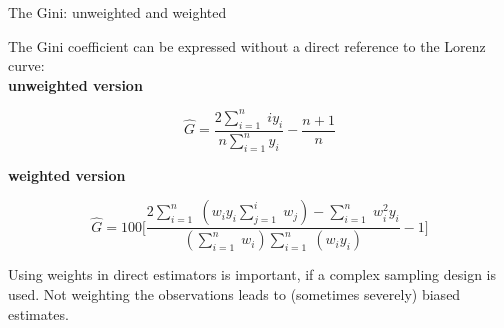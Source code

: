 \documentclass[fleqn,final]{beamer}
\newcommand{\Pheight}{\rule[-5mm]{0cm}{1cm}}
\begin{document}
\begin{frame}
\begin{columns}[t]
\begin{column}{.3\linewidth}
 \begin{block}{The Gini: unweighted and weighted \Pheight}
The Gini coefficient can be expressed without a direct reference to the Lorenz curve:\\
\vskip 0.5cm
\textbf{unweighted version}
\begin{tcolorbox}
\begin{equation*}
\hat{G}={\frac {2\sum_{i=1}^{n}\;iy_{i}}{n\sum _{i=1}^{n}y_{i}}}-{\frac {n+1}{n}}
\end{equation*}
\end{tcolorbox}
\vskip 0.5cm
\textbf{weighted version}
\begin{tcolorbox}
\begin{equation*}
\hat{G}=100\Bigg[{\frac {2\sum_{i=1}^{n}\;(w_{i}y_{i}\sum_{j=1}^{i}\;w_{j})-\sum_{i=1}^{n}\;w_{i}^{2}y_{i}}{(\sum_{i=1}^{n}\;w_{i})\sum_{i=1}^{n}\;(w_{i}y_{i})}-1}\Bigg]
\end{equation*}
\end{tcolorbox}
\vskip 0.5cm
{\selectfont{}\relax} Using weights in direct estimators is important, if a complex sampling design is used. Not weighting the observations leads to (sometimes severely) biased estimates.
\end{block}
\end{column}

%
%

\end{columns}


\begin{columns}[t]


%
%



\end{columns}
\end{frame}
\end{document}
